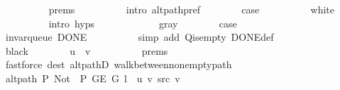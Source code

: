 \begin{isabellebody}
\ \ \ \ \ \ \ \ \isamarkupfalse%
\ {\isachardoublequoteopen}{}{\isachardot}{\kern0pt}prems{\isachardoublequoteclose}{\isacharparenleft}{\kern0pt}{}{\isacharparenright}{\kern0pt}\isanewline
\ \ \ \ \ \ \ \ \isamarkupfalse%
\ {\isacharparenleft}{\kern0pt}intro\ alt{\isacharunderscore}{\kern0pt}path{\isacharunderscore}{\kern0pt}pref{\isacharparenright}{\kern0pt}\isanewline
\ \ \ \ \ \ \isamarkupfalse%
\ {\isacharquery}{\kern0pt}case\isanewline
\ \ \ \ \ \ \ \ \isamarkupfalse%
\ white\isanewline
\ \ \ \ \ \ \ \ \isamarkupfalse%
\ {\isacharparenleft}{\kern0pt}intro\ {\isachardoublequoteopen}{}{\isachardot}{\kern0pt}hyps{\isachardoublequoteclose}{\isacharparenright}{\kern0pt}\isanewline
\ \ \ \ \isamarkupfalse%
\isanewline
\ \ \ \ \ \ \isamarkupfalse%
\ gray\isanewline
\ \ \ \ \ \ \isamarkupfalse%
\ {\isacharquery}{\kern0pt}case\isanewline
\ \ \ \ \ \ \ \ \isamarkupfalse%
\ invar{\isacharunderscore}{\kern0pt}queue\ DONE\isanewline
\ \ \ \ \ \ \ \ \isamarkupfalse%
\ {\isacharparenleft}{\kern0pt}simp\ add{\isacharcolon}{\kern0pt}\ Q{\isachardot}{\kern0pt}is{\isacharunderscore}{\kern0pt}empty\ DONE{\isacharunderscore}{\kern0pt}def{\isacharparenright}{\kern0pt}\isanewline
\ \ \ \ \isamarkupfalse%
\isanewline
\ \ \ \ \ \ \isamarkupfalse%
\ black\isanewline
\ \ \ \ \ \ \isamarkupfalse%
\ {\isachardoublequoteopen}u{\isacharprime}{\kern0pt}\ {\isacharequal}{\kern0pt}\ v{\isachardoublequoteclose}\isanewline
\ \ \ \ \ \ \ \ \isamarkupfalse%
\ {\isachardoublequoteopen}{}{\isachardot}{\kern0pt}prems{\isachardoublequoteclose}{\isacharparenleft}{\kern0pt}{}{\isacharparenright}{\kern0pt}\isanewline
\ \ \ \ \ \ \ \ \isamarkupfalse%
\ {\isacharparenleft}{\kern0pt}fastforce\ dest{\isacharcolon}{\kern0pt}\ alt{\isacharunderscore}{\kern0pt}pathD{\isacharparenleft}{\kern0pt}{}{\isacharparenright}{\kern0pt}\ walk{\isacharunderscore}{\kern0pt}between{\isacharunderscore}{\kern0pt}nonempty{\isacharunderscore}{\kern0pt}path{\isacharparenleft}{\kern0pt}{}{\isacharparenright}{\kern0pt}{\isacharparenright}{\kern0pt}\isanewline
\ \ \ \ \ \ \isamarkupfalse%
\ {\isachardoublequoteopen}alt{\isacharunderscore}{\kern0pt}path\ P{\isacharprime}{\kern0pt}{\isacharprime}{\kern0pt}\ {\isacharparenleft}{\kern0pt}Not\ {\isasymcirc}\ P{\isacharprime}{\kern0pt}{\isacharprime}{\kern0pt}{\isacharparenright}{\kern0pt}\ {\isacharparenleft}{\kern0pt}G{\isachardot}{\kern0pt}E\ G{\isacharparenright}{\kern0pt}\ {\isacharparenleft}{\kern0pt}l\ {\isacharat}{\kern0pt}\ {\isacharbrackleft}{\kern0pt}u{\isacharcomma}{\kern0pt}\ v{\isacharbrackright}{\kern0pt}{\isacharparenright}{\kern0pt}\ src\ v{\isachardoublequoteclose}\isanewline

\end{isabellebody}
